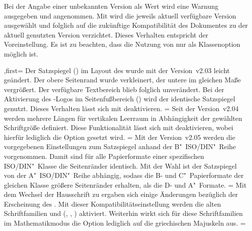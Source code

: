 \begin{Entity}{}
\begin{Declaration}
Bei der Angabe einer unbekannten Version als Wert wird eine Warnung ausgegeben 
und  angenommen. Mit  wird die 
jeweils aktuell verfügbare Version ausgewählt und folglich auf die zukünftige 
Kompatibilität des Dokumentes zu der aktuell genutzten Version verzichtet. 
Dieses Verhalten entspricht der Voreinstellung. Es ist zu beachten, dass die 
Nutzung von  nur als Klassenoption möglich ist.
\begin{DeclareValues}
,first=
  Der Satzspiegel () im Layout des 
  \CDs wurde mit der Version~v2.03 leicht geändert. Der obere Seitenrand wurde 
  verkleinert, der untere im gleichen Maße vergrößert. Der verfügbare 
  Textbereich blieb folglich unverändert. Bei der Aktivierung des \DDC-Logos im 
  Seitenfußbereich () wird der 
  identische Satzspiegel genutzt. Dieses Verhalten lässt sich mit 
   deaktivieren.
=
  Seit der Version~v2.04 werden mehrere Längen für vertikalen Leerraum in 
  Abhängigkeit der gewählten Schriftgröße definiert. Diese Funktionalität lässt 
  sich mit  deaktivieren, wobei hierfür lediglich die 
  Option  gesetzt wird. 
=
  Mit der Version~v2.05 werden die vorgegebenen Einstellungen zum Satzspiegel 
  anhand der B"~ISO/DIN"~Reihe vorgenommen. Damit sind für alle Papierformate 
  einer spezifischen ISO/DIN"~Klasse die Seitenränder identisch. Mit der Wahl 
   ist der Satzspiegel von der A"~ISO/DIN"~Reihe 
  abhängig, sodass die B- und C"~Papierformate der gleichen Klasse größere 
  Seitenränder erhalten, als die D- und A"~Formate.
=
  Mit dem Wechsel der Hausschrift zu \OpenSans ergaben sich einige Änderungen 
  bezüglich der Erscheinung des \CDs. Mit dieser Kompatibilitätseinstellung 
  werden die alten Schriftfamilien \Univers und \DIN 
  (, , )
  aktiviert. Weiterhin wirkt sich für diese Schriftfamilien im Mathematikmodus 
  die Option  lediglich auf die griechischen 
  Majuskeln aus.
=
  \ChangedAt{%
}
\end{DeclareValues}
\end{Declaration}
\end{Entity}

